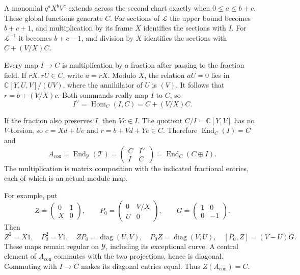 A monomial $q^aX^bV^c$ extends across the second chart exactly
when $0\leq a\leq b+c$. These global functions generate $C$.
For sections of $\mathcal L$ the upper bound becomes $b+c+1$,
and multiplication by its frame $X$ identifies the sections
with $I$. For $\mathcal L^{-1}$ it becomes $b+c-1$, and division
by $X$ identifies the sections with $C+(V/X)C$.

Every map $I\to C$ is multiplication by a fraction after passing
to the fraction field. If $rX,rU\in C$, write $a=rX$.
Modulo $X$, the relation $aU=0$ lies in
$\mathbb C[Y,U,V]/(UV)$, where the annihilator of $U$ is $(V)$.
It follows that $r=b+(V/X)c$.
Both summands really map $I$ to $C$, so
\[
 I^\vee=\operatorname{Hom}_C(I,C)=C+(V/X)C.
\]

If the fraction also preserves $I$, then $Vc\in I$.
The quotient $C/I=\mathbb C[Y,V]$ has no $V$-torsion, so
$c=Xd+Ue$ and $r=b+Vd+Ye\in C$.
Therefore $\operatorname{End}_C(I)=C$ and
\begin{equation}\label{cyrec:eq:conifold-end}
 A_{\mathrm{con}}=\operatorname{End}_{\mathcal Y}(\mathcal T)
     =\begin{pmatrix}C&I^\vee\\ I&C\end{pmatrix}
     =\operatorname{End}_C(C\oplus I).
\end{equation}
The multiplication is matrix composition with the indicated
fractional entries, each of which is an actual module map.

For example, put
\begin{equation}\label{cyrec:eq:conifold-matrices}
 Z=\begin{pmatrix}0&1\\X&0\end{pmatrix},\qquad
 P_0=\begin{pmatrix}0&V/X\\U&0\end{pmatrix},\qquad
 G=\begin{pmatrix}1&0\\0&-1\end{pmatrix}.
\end{equation}
Then
\[
 Z^2=X1,\quad P_0^2=Y1,\quad
 ZP_0=\operatorname{diag}(U,V),\quad
 P_0Z=\operatorname{diag}(V,U),\quad
 [P_0,Z]=(V-U)G.
\]
These maps remain regular on $\mathcal Y$, including its
exceptional curve. A central element of $A_{\mathrm{con}}$
commutes with the two projections, hence is diagonal. Commuting
with $I\to C$ makes its diagonal entries equal.
Thus $Z(A_{\mathrm{con}})=C$.


